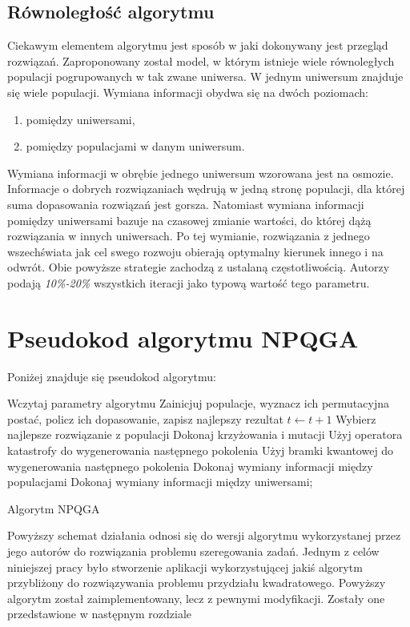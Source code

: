 \subsection{Równoległość algorytmu}
Ciekawym elementem algorytmu jest sposób w jaki dokonywany jest przegląd rozwiązań. Zaproponowany został model, w którym istnieje wiele równoległych populacji pogrupowanych w tak zwane uniwersa. W jednym uniwersum znajduje się wiele populacji. Wymiana informacji obydwa się na dwóch poziomach:
\begin{enumerate}
\item pomiędzy uniwersami,
\item pomiędzy populacjami w danym uniwersum.
\end{enumerate}

Wymiana informacji w obrębie jednego uniwersum wzorowana jest na osmozie. Informacje o dobrych rozwiązaniach wędrują w jedną stronę populacji, dla której suma dopasowania rozwiązań jest gorsza. Natomiast wymiana informacji pomiędzy uniwersami bazuje na czasowej zmianie wartości, do której dążą rozwiązania w innych uniwersach. Po tej wymianie, rozwiązania z jednego wszechświata jak cel swego rozwoju obierają optymalny kierunek innego i na odwrót.
Obie powyższe strategie zachodzą z ustalaną częstotliwością. Autorzy podają \textit{10\%-20\%} wszystkich iteracji jako typową wartość tego parametru. 

\section{Pseudokod algorytmu NPQGA}
Poniżej znajduje się pseudokod algorytmu:
\newpage
\begin{algorithm}[H]
	Wczytaj parametry algorytmu\;
	Zainicjuj populacje, wyznacz ich permutacyjna postać, policz ich dopasowanie, zapisz najlepszy rezultat
 	{
 		$t\leftarrow t+1$\;
  		{
  			Wybierz najlepsze rozwiązanie z populacji\;
  			Dokonaj krzyżowania i mutacji\;
  			{
  				Użyj operatora katastrofy do wygenerowania następnego pokolenia\;
  			}
  			\Else
  			{
  				Użyj bramki kwantowej do wygenerowania następnego pokolenia\;
  			}
  		}
  		{
  			Dokonaj wymiany informacji między populacjami\;
  		}
  		{
  			Dokonaj wymiany informacji między uniwersami;
  		}
 	}
 	\caption{Algorytm NPQGA}
\end{algorithm}

Powyższy schemat działania odnosi się do wersji algorytmu wykorzystanej przez jego autorów do rozwiązania problemu szeregowania zadań. Jednym z celów niniejszej pracy było stworzenie aplikacji wykorzystującej jakiś algorytm przybliżony do rozwiązywania problemu przydziału kwadratowego. Powyższy algorytm został zaimplementowany, lecz z pewnymi modyfikacji. Zostały one przedstawione w następnym rozdziale
